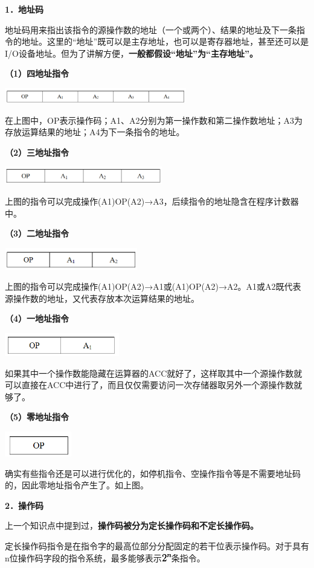 \textbf{{1．地址码}}

地址码用来指出该指令的源操作数的地址（一个或两个）、结果的地址及下一条指令的地址。这里的``地址''既可以是主存地址，也可以是寄存器地址，甚至还可以是I/O设备地址。但为了讲解方便，\textbf{一般都假设``地址''为``主存地址''。}

\textbf{（1）四地址指令}

\includegraphics[width=3.12500in,height=0.26042in]{png-jpeg-pics/BF3E8018C03B31258CD9DADA3A9A3773.png}

在上图中，OP表示操作码；A1、A2分别为第一操作数和第二操作数地址；A3为存放运算结果的地址；A4为下一条指令的地址。

\textbf{（2）三地址指令}

\includegraphics[width=2.70833in,height=0.30208in]{png-jpeg-pics/25068EE2D120888934E90DF46A69D0C6.png}

上图的指令可以完成操作(A1)OP(A2)→A3，后续指令的地址隐含在程序计数器中。

\textbf{（3）二地址指令}

\includegraphics[width=2.29167in,height=0.37500in]{png-jpeg-pics/98ACA8040BA0254C8FACDC0EF0D6608A.png}

{{上图}{的指令可以完成操作}(A1)OP(A2)→A1或(A1)OP(A2)→A2。A1或A2既代表源操作数的地址，又代表存放本次运算结果的地址。}

\textbf{（4）一地址指令}

\includegraphics[width=1.96875in,height=0.39583in]{png-jpeg-pics/20F9250079D6870C31C1E6D5AD378D82.png}

如果其中一个操作数能隐藏在运算器的ACC就好了，这样取其中一个源操作数就可以直接在ACC中进行了，而且仅仅需要访问一次存储器取另外一个源操作数就够了。

\textbf{（5）零地址指令}

\includegraphics[width=1.14583in,height=0.42708in]{png-jpeg-pics/B1D45AE4B9EE447256AF80A41EBC9101.png}

确实有些指令还是可以进行优化的，如停机指令、空操作指令等是不需要地址码的，因此零地址指令产生了。如上图。

{\textbf{2．操作码}}

上一个知识点中提到过，\textbf{操作码被分为定长操作码和不定长操作码。}

定长操作码指令是在指令字的最高位部分分配固定的若干位表示操作码。对于具有n位操作码字段的指令系统，最多能够表示\includegraphics[width=0.16667in,height=0.12500in]{texmath/e538e52n}条指令。
